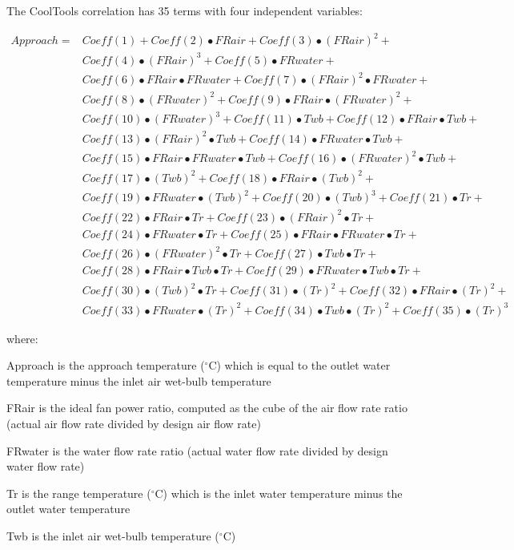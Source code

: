 The CoolTools correlation has 35 terms with four independent variables:

\begin{equation}
\begin{array}{rl}
Approach =& Coeff(1) + Coeff(2)•FRair + Coeff(3)•(FRair)^{2} + \\
 & Coeff(4)•(FRair)^{3} + Coeff(5)•FRwater + \\
 & Coeff(6)•FRair•FRwater + Coeff(7)•(FRair)^{2}•FRwater + \\
 & Coeff(8)•(FRwater)^{2} + Coeff(9)•FRair•(FRwater)^{2} + \\
 & Coeff(10)•(FRwater)^{3} + Coeff(11)•Twb + Coeff(12)•FRair•Twb + \\
 & Coeff(13)•(FRair)^{2}•Twb + Coeff(14)•FRwater•Twb + \\
 & Coeff(15)•FRair•FRwater•Twb + Coeff(16)•(FRwater)^{2}•Twb + \\
 & Coeff(17)•(Twb)^{2} + Coeff(18)•FRair•(Twb)^{2} + \\
 & Coeff(19)•FRwater•(Twb)^{2} + Coeff(20)•(Twb)^{3} + Coeff(21)•Tr +  \\
 & Coeff(22)•FRair•Tr + Coeff(23)•(FRair)^{2}•Tr + \\
 & Coeff(24)•FRwater•Tr + Coeff(25)•FRair•FRwater•Tr + \\
 & Coeff(26)•(FRwater)^{2}•Tr + Coeff(27)•Twb•Tr + \\
 & Coeff(28)•FRair•Twb•Tr + Coeff(29)•FRwater•Twb•Tr + \\
 & Coeff(30)•(Twb)^{2}•Tr + Coeff(31)•(Tr)^{2} + Coeff(32)•FRair•(Tr)^{2} + \\
 & Coeff(33)•FRwater•(Tr)^{2} + Coeff(34)•Twb•(Tr)^{2} + Coeff(35)•(Tr)^{3}
\end{array}
\end{equation}

where:

Approach is the approach temperature (\(^{\circ}\)C) which is equal to the outlet water temperature minus the inlet air wet-bulb temperature

FRair is the ideal fan power ratio, computed as the cube of the air flow rate ratio (actual air flow rate divided by design air flow rate)

FRwater is the water flow rate ratio (actual water flow rate divided by design water flow rate)

Tr is the range temperature (\(^{\circ}\)C) which is the inlet water temperature minus the outlet water temperature

Twb is the inlet air wet-bulb temperature (\(^{\circ}\)C)

